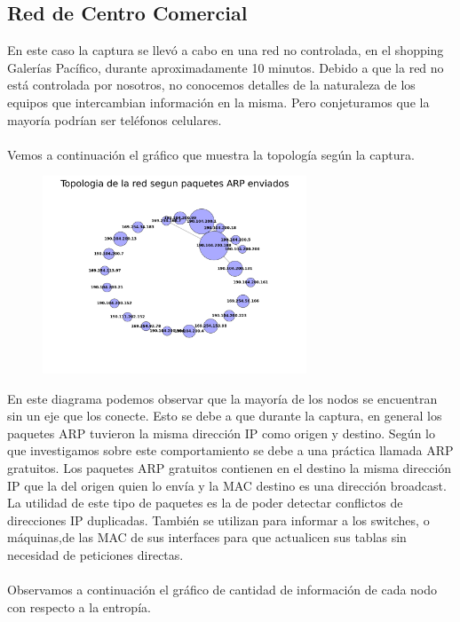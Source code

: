 \subsection{Red de Centro Comercial}

En este caso la captura se llevó a cabo en una red no controlada, en el shopping Galerías Pacífico, durante aproximadamente 10 minutos.
Debido a que la red no está controlada por nosotros, no conocemos detalles de la naturaleza de los equipos que intercambian información en la misma. Pero conjeturamos que la mayoría podrían ser teléfonos celulares.
\\\\
Vemos a continuación el gráfico que muestra la topología según la captura.

\begin{figure}[ht!]
  \centering
   \includegraphics[width=0.7\textwidth]{graficos/shopping_network.png}
  \caption{}
  \label{fig:shopping_network}
\end{figure}

En este diagrama podemos observar que la mayoría de los nodos se encuentran sin un eje que los conecte. Esto se debe a que durante la captura, en general los paquetes ARP tuvieron la misma dirección IP como origen y destino. Según lo que investigamos sobre este comportamiento se debe a una práctica llamada ARP gratuitos. Los paquetes ARP gratuitos contienen en el destino la misma dirección IP que la del origen quien lo envía y la MAC destino es una dirección broadcast. La utilidad de este tipo de paquetes es la de poder detectar conflictos de direcciones IP duplicadas. También se utilizan para informar a los switches, o máquinas,de las MAC de sus interfaces para que actualicen sus tablas sin necesidad de peticiones directas.
\\\\
Observamos a continuación el gráfico de cantidad de información de cada nodo con respecto a la entropía.

